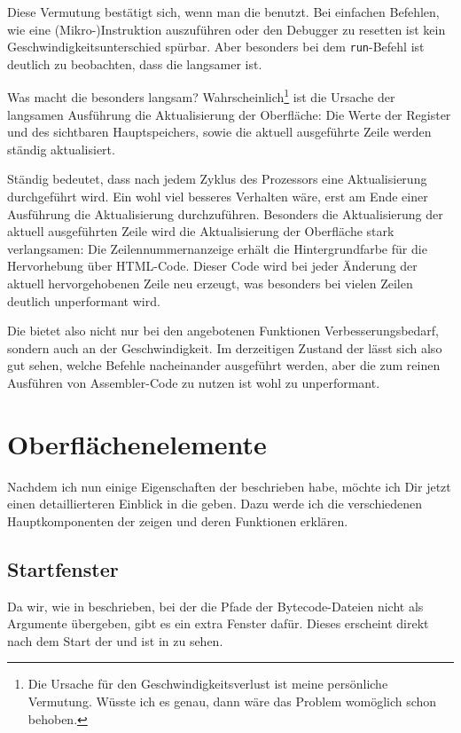 Diese Vermutung bestätigt sich, wenn man die \mdg benutzt. Bei einfachen Befehlen, wie eine (Mikro-)Instruktion auszuführen oder den Debugger zu resetten ist kein Geschwindigkeitsunterschied spürbar. Aber besonders bei dem \texttt{run}-Befehl ist deutlich zu beobachten, dass die \mdg langsamer ist.

Was macht die \mdg besonders langsam? Wahrscheinlich\footnote{Die Ursache für den Geschwindigkeitsverlust ist meine persönliche Vermutung. Wüsste ich es genau, dann wäre das Problem womöglich schon behoben.} ist die Ursache der langsamen Ausführung die Aktualisierung der Oberfläche: Die Werte der Register und des sichtbaren Hauptspeichers, sowie die aktuell ausgeführte Zeile werden ständig aktualisiert.

Ständig bedeutet, dass nach jedem Zyklus des Prozessors eine Aktualisierung durchgeführt wird. Ein wohl viel besseres Verhalten wäre, erst am Ende einer Ausführung die Aktualisierung durchzuführen. Besonders die Aktualisierung der aktuell ausgeführten Zeile wird die Aktualisierung der Oberfläche stark verlangsamen: Die Zeilennummernanzeige erhält die Hintergrundfarbe für die Hervorhebung über HTML-Code. Dieser Code wird bei jeder Änderung der aktuell hervorgehobenen Zeile neu erzeugt, was besonders bei vielen Zeilen deutlich unperformant wird.

Die \mdg bietet also nicht nur bei den angebotenen Funktionen Verbesserungsbedarf, sondern auch an der Geschwindigkeit. Im derzeitigen Zustand der \mdg lässt sich also gut sehen, welche Befehle nacheinander ausgeführt werden, aber die \mdg zum reinen Ausführen von Assembler-Code zu nutzen ist wohl zu unperformant.

\section{Oberflächenelemente}
Nachdem ich nun einige Eigenschaften der \mdg beschrieben habe, möchte ich Dir jetzt einen detaillierteren Einblick in die \mdg geben. Dazu werde ich die verschiedenen Hauptkomponenten der \mdg zeigen und deren Funktionen erklären.

\subsection{Startfenster}
Da wir, wie in  beschrieben, bei der \mdg die Pfade der Bytecode-Dateien nicht als Argumente übergeben, gibt es ein extra Fenster dafür. Dieses erscheint direkt nach dem Start der \mdg und ist in  zu sehen.

